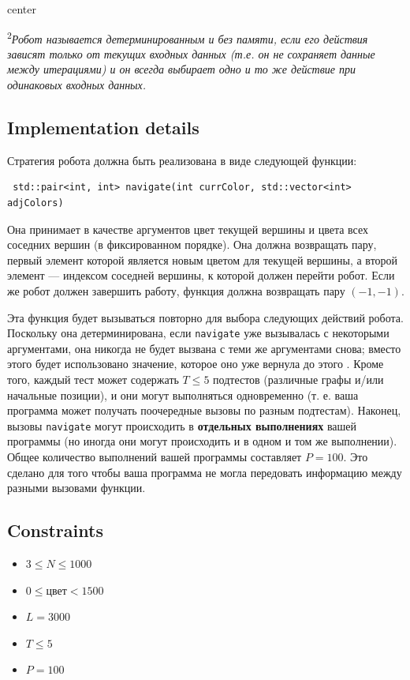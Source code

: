\documentclass[12pt]{article}
\begin{document}
\begin{adjustbox}{center}
	
\end{adjustbox}

\textsuperscript{2}\textit{Робот называется детерминированным и без памяти, если его действия зависят только от текущих входных данных (т.е. он не сохраняет данные между итерациями) и он всегда выбирает одно и то же действие при одинаковых входных данных.}

\subsection{Implementation details}
Стратегия робота должна быть реализована в виде следующей функции:
\begin{lstlisting}
 std::pair<int, int> navigate(int currColor, std::vector<int> adjColors)
\end{lstlisting}

Она принимает в качестве аргументов цвет текущей вершины и цвета всех соседних вершин (в фиксированном порядке). Она должна возвращать пару, первый элемент которой является новым цветом для текущей вершины, а второй элемент — индексом соседней вершины, к которой должен перейти робот. Если же робот должен завершить работу, функция должна возвращать пару $(-1, -1)$.

Эта функция будет вызываться повторно для выбора следующих действий робота. Поскольку она детерминирована, если \texttt{navigate} уже вызывалась с некоторыми аргументами, она никогда не будет вызвана с теми же аргументами снова; вместо этого будет использовано значение, которое оно уже вернула до этого . Кроме того, каждый тест может содержать $T \leq 5$ подтестов (различные графы и/или начальные позиции), и они могут выполняться одновременно (т. е. ваша программа может получать поочередные вызовы по разным подтестам). Наконец, вызовы \texttt{navigate} могут происходить в \textbf{отдельных выполнениях} вашей программы (но иногда они могут происходить и в одном и том же выполнении). Общее количество выполнений вашей программы составляет $P = 100$. Это сделано для того чтобы ваша программа не могла передовать информацию между разными вызовами функции. 

\subsection{Constraints}

\begin{itemize}
\item $3 \leq N \leq 1000$
\item $0 \leq \mathrm{цвет} < 1500$
\item $L = 3000$
\item $T \leq 5$
\item $P = 100$
\end{itemize}
\end{document}
